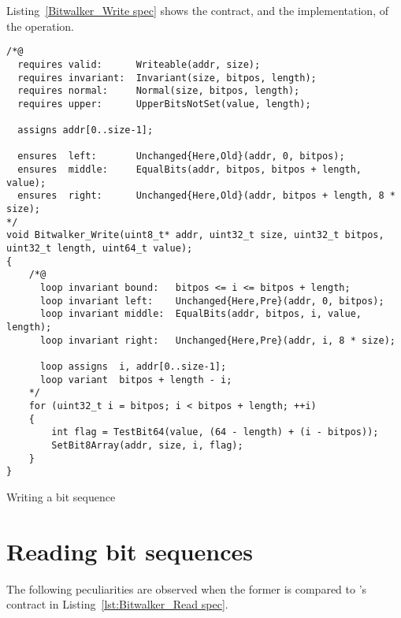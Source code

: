 \FloatBarrier


Listing~\ref{Bitwalker_Write spec} shows the contract, and the
implementation, of the
 operation.

\begin{listing}[hbt]
\begin{minipage}{0.99\textwidth}
\begin{lstlisting}[style=acsl-block]
/*@
  requires valid:      Writeable(addr, size);
  requires invariant:  Invariant(size, bitpos, length);
  requires normal:     Normal(size, bitpos, length);
  requires upper:      UpperBitsNotSet(value, length);

  assigns addr[0..size-1];

  ensures  left:       Unchanged{Here,Old}(addr, 0, bitpos);
  ensures  middle:     EqualBits(addr, bitpos, bitpos + length, value);
  ensures  right:      Unchanged{Here,Old}(addr, bitpos + length, 8 * size);
*/
void Bitwalker_Write(uint8_t* addr, uint32_t size, uint32_t bitpos, uint32_t length, uint64_t value);
{
    /*@
      loop invariant bound:   bitpos <= i <= bitpos + length;
      loop invariant left:    Unchanged{Here,Pre}(addr, 0, bitpos);
      loop invariant middle:  EqualBits(addr, bitpos, i, value, length);
      loop invariant right:   Unchanged{Here,Pre}(addr, i, 8 * size);

      loop assigns  i, addr[0..size-1];
      loop variant  bitpos + length - i;
    */
    for (uint32_t i = bitpos; i < bitpos + length; ++i)
    {
        int flag = TestBit64(value, (64 - length) + (i - bitpos));
        SetBit8Array(addr, size, i, flag);
    }   
}

\end{lstlisting}
\end{minipage}
\caption{\label{Bitwalker_Write spec}Writing a bit sequence}
\end{listing}

\FloatBarrier

\section{Reading bit sequences}
\label{sec:reading bit sequences}

The following peculiarities are observed when the former is
compared to 's contract in Listing~\ref{lst:Bitwalker_Read spec}.

